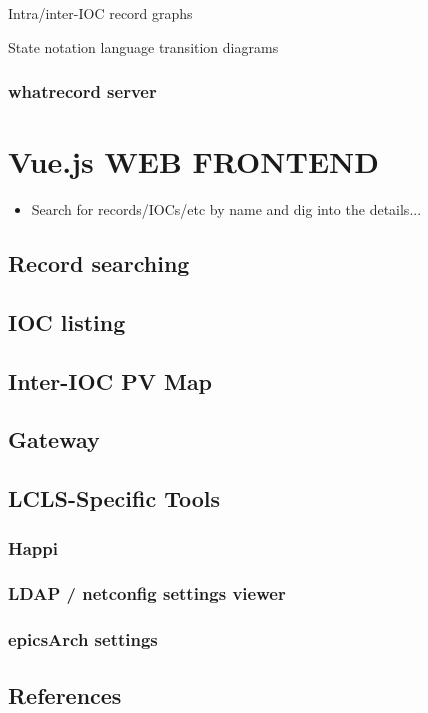 \documentclass[letter,
               keeplastbox,   %
               ]{jacow}
\begin{document}
Intra/inter-IOC record graphs

State notation language transition diagrams

\subsubsection{whatrecord server}

\section{Vue.js WEB FRONTEND}

\begin{itemize}
  \item Search for records/IOCs/etc by name and dig into the details...
\end{itemize}

\subsection{Record searching}
\subsection{IOC listing}
\subsection{Inter-IOC PV Map}
\subsection{Gateway}
\subsection{LCLS-Specific Tools}
\subsubsection{Happi}
\subsubsection{LDAP / netconfig settings viewer}
\subsubsection{epicsArch settings}

\subsection{References}
\end{document}

